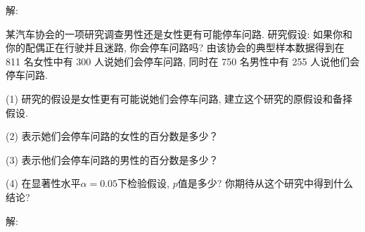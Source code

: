 \documentclass[standard]{ExBook}
\begin{document}
\begin{qitems}
\vspace{-5em}

    \begin{bbox}
解: 
    \end{bbox}

\vspace{-5em}

    \begin{bbox}
    \begin{shaded}
        \qitem
某汽车协会的一项研究调查男性还是女性更有可能停车问路. 研究假设: 如果你和你的配偶正在行驶并且迷路, 你会停车问路吗? 由该协会的典型样本数据得到在 811 名女性中有 300 人说她们会停车问路, 同时在 750 名男性中有 255 人说他们会停车问路.

(1) 研究的假设是女性更有可能说她们会停车问路, 建立这个研究的原假设和备择假设.

(2) 表示她们会停车问路的女性的百分数是多少？

(3) 表示他们会停车问路的男性的百分数是多少？

(4) 在显著性水平$\alpha=0.05$下检验假设, $p$值是多少? 你期待从这个研究中得到什么结论?
    \end{shaded}
    \end{bbox}

\vspace{-5em}

    \begin{bbox}
解: 
    \end{bbox}
\end{qitems}


\section{}
\end{document}
